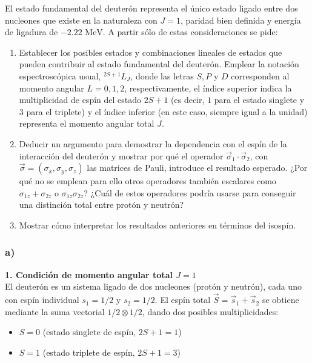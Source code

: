 \newpage
\begin{problema}
El estado fundamental del deuterón representa el único estado ligado entre dos nucleones que existe en la naturaleza con $J = 1$, paridad bien definida y energía de ligadura de $-2.22\text{ MeV}$. A partir sólo de estas consideraciones se pide:

\begin{enumerate}[label=\alph*)]
    \item Establecer los posibles estados y combinaciones lineales de estados que pueden contribuir al estado fundamental del deuterón. Emplear la notación espectroscópica usual, ${}^{2S+1}L_J$, donde las letras $S, P$ y $D$ corresponden al momento angular $L = 0, 1, 2$, respectivamente, el índice superior indica la multiplicidad de espín del estado $2S+1$ (es decir, $1$ para el estado singlete y $3$ para el triplete) y el índice inferior (en este caso, siempre igual a la unidad) representa el momento angular total $J$.
    \item Deducir un argumento para demostrar la dependencia con el espín de la interacción del deuterón y mostrar por qué el operador $\vec{\sigma}_1 \cdot \vec{\sigma}_2$, con $\vec{\sigma} = (\sigma_x, \sigma_y, \sigma_z)$ las matrices de Pauli, introduce el resultado esperado. ¿Por qué no se emplean para ello otros operadores también escalares como $\sigma_{1z} + \sigma_{2z}$ o $\sigma_{1z} \sigma_{2z}$? ¿Cuál de estos operadores podría usarse para conseguir una distinción total entre protón y neutrón?
    \item Mostrar cómo interpretar los resultados anteriores en términos del isospín.
\end{enumerate}

\tcblower

\subsubsection*{a)}

\textbf{1. Condición de momento angular total $J = 1$}\\
El deuterón es un sistema ligado de dos nucleones (protón y neutrón), cada uno con espín individual $s_1 = 1/2$ y $s_2 = 1/2$. El espín total $\vec{S} = \vec{s}_1 + \vec{s}_2$ se obtiene mediante la suma vectorial $1/2 \otimes 1/2$, dando dos posibles multiplicidades:
\begin{itemize}
    \item $S = 0$ (estado singlete de espín, $2S+1 = 1$)
    \item $S = 1$ (estado triplete de espín, $2S+1 = 3$)
\end{itemize}


\end{problema}
